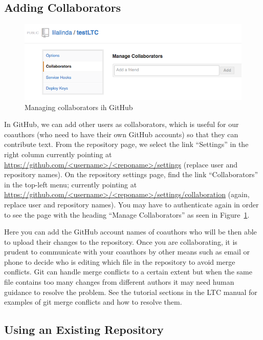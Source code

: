 \subsection{Adding Collaborators}

\begin{figure}
\centering
\includegraphics[scale=\myscale]{figures/collaborators}
\caption{Managing collaborators ih GitHub} \label{fig:collaborators}
\end{figure}
In GitHub, we can add other users as collaborators, which is useful for our coauthors (who need to have their own GitHub accounts) so that they can contribute text.  From the repository page, we select the link ``Settings'' in the right column currently pointing at \url{https://github.com/<username>/<reponame>/settings} (replace user and repository names).  On the repository settings page, find the link ``Collaborators'' in the top-left menu; currently pointing at \url{https://github.com/<username>/<reponame>/settings/collaboration} (again, replace user and repository names).  You may have to authenticate again in order to see the page with the heading ``Manage Collaborators'' as seen in Figure~\ref{fig:collaborators}.

Here you can add the GitHub account names of coauthors who will be then able to upload their changes to the repository.  Once you are collaborating, it is prudent to communicate with your coauthors by other means such as email or phone to decide who is editing which file in the repository to avoid merge conflicts.  Git can handle merge conflicts to a certain extent but when the same file contains too many changes from different authors it may need human guidance to resolve the problem.  See the tutorial sections in the LTC manual for examples of git merge conflicts and how to resolve them.

\subsection{Using an Existing Repository} \label{sec:existing}

